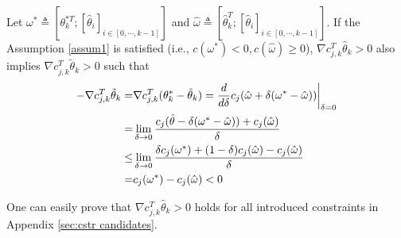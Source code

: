 \documentclass[lettersize,journal]{IEEEtran}
\begin{document}
Let $\omega^*\triangleq [\theta_k^{*T}; [\hat\theta_i]_{i\in[0,\cdots,k-1]}]$ and $\hat\omega\triangleq [\hat\theta_k^{T}; [\hat\theta_i]_{i\in[0,\cdots,k-1]}]$. 
If the Assumption \ref{assum1} is satisfied (i.e., $c(\omega^*)<0,c(\hat\omega)\ge 0$), $\nabla c_{j,k}^T\hat\theta_k>0$ also implies $\nabla c_{j,k}^T\tilde\theta_k>0$ such that 
\begin{equation}
    \begin{aligned}
        -\nabla c_{j,k}^T \tilde\theta_k=&\nabla c_{j,k}^T(\theta_k^*-\hat\theta_k)
        =
        {d\over d\delta } c_j(\hat\omega +\delta (\omega^*-\hat\omega))\bigg\vert _{\delta=0} \\
        =& \lim_{\delta\to 0} {c_j(\hat\theta-\delta(\omega^*-\hat\omega)) + c_j(\hat\omega)\over \delta}\\
        \le& \lim_{\delta\to0} {\delta c_j(\omega^*) + (1-\delta) c_j(\hat\omega)-c_j(\hat\omega)\over \delta}
        \\
        =& c_j(\omega^*) - c_j(\hat\omega) < 0
        \end{aligned}
\end{equation}

One can easily prove that $\nabla c_{j,k}^T\hat\theta_k>0$ holds for all introduced constraints in Appendix \ref{sec:cstr candidates}.



\end{document}
